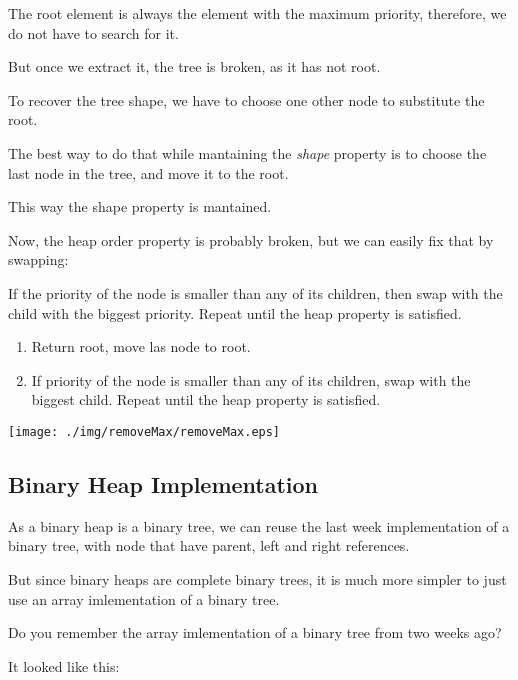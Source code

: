 \documentclass[a4paper, 9pt]{extarticle}
\begin{document}
\begin{multicols}{2}

The root element is always the element with the maximum priority, therefore, we
do not have to search for it.

But once we extract it, the tree is broken, as it has not root.

To recover the tree shape, we have to choose one other node to substitute the root.

The best way to do that while mantaining the \emph{shape} property is to choose
the last node in the tree, and move it to the root.

This way the shape property is mantained.

Now, the heap order property is probably broken, but we can easily fix that by swapping:

If the priority of the node is smaller than any of its children, then swap with
the child with the biggest priority. Repeat until the heap property is satisfied.

\begin{enumerate}

  \item Return root, move las node to root.

  \item If priority of the node is smaller than any of its children,
    swap with the biggest child. Repeat until the heap property is satisfied.

\end{enumerate}
\columnbreak
\begin{center}
  \texttt{[image: ./img/removeMax/removeMax.eps]}
\end{center}
\end{multicols}


\subsection{Binary Heap Implementation}

As a binary heap is a binary tree, we can reuse the last week implementation of
a binary tree, with node that have parent, left and right references.

But since binary heaps are complete binary trees, it is much more simpler to
just use an array imlementation of a binary tree.

Do you remember the array imlementation of a binary tree from two weeks ago?

It looked like this:
\end{document}
